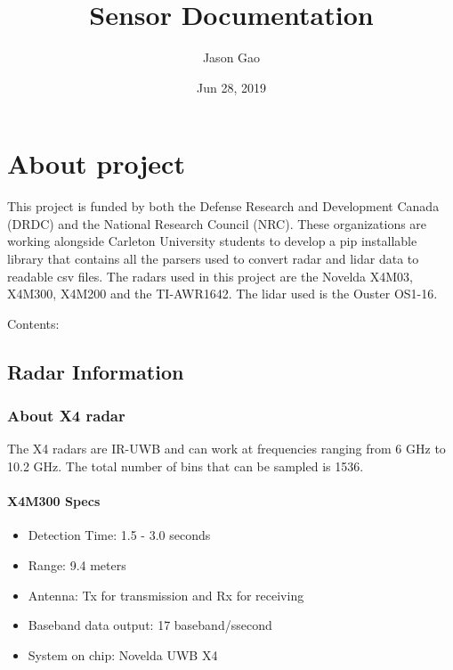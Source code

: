 \documentclass[letterpaper,10pt,english]{sphinxmanual}
\title{Sensor Documentation}
\date{Jun 28, 2019}
\author{Jason Gao}
\begin{document}
\pagestyle{empty}
\sphinxmaketitle
\pagestyle{plain}
\tableofcontents
\pagestyle{normal}
\label{\detokenize{index::doc}}



\chapter{About project}
\label{\detokenize{index:about-project}}
This project is funded by both the Defense Research and Development Canada (DRDC) and the National Research Council (NRC). These organizations are working alongside Carleton University students
to develop a pip installable library that contains all the parsers used to convert radar and lidar data to readable csv files.
The radars used in this project are the Novelda X4M03, X4M300, X4M200 and the TI-AWR1642. The lidar used is the Ouster OS1-16.

Contents:


\section{Radar Information}
\label{\detokenize{Radar information:radar-information}}\label{\detokenize{Radar information::doc}}

\subsection{About X4 radar}
\label{\detokenize{Radar information:about-x4-radar}}
The X4 radars are IR-UWB and can work at frequencies ranging from 6 GHz to 10.2 GHz. The total number of bins that can be sampled is 1536.


\subsubsection{X4M300 Specs}
\label{\detokenize{Radar information:x4m300-specs}}\begin{itemize}
\item {} 
Detection Time: 1.5 - 3.0 seconds

\item {} 
Range: 9.4 meters

\item {} 
Antenna: Tx for transmission and Rx for receiving

\item {} 
Baseband data output: 17 baseband/ssecond

\item {} 
System on chip: Novelda UWB X4

\end{itemize}
\end{document}
